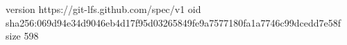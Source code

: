 version https://git-lfs.github.com/spec/v1
oid sha256:069d94e34d9046eb4d17f95d03265849fe9a7577180fa1a7746c99dcedd7e58f
size 598
